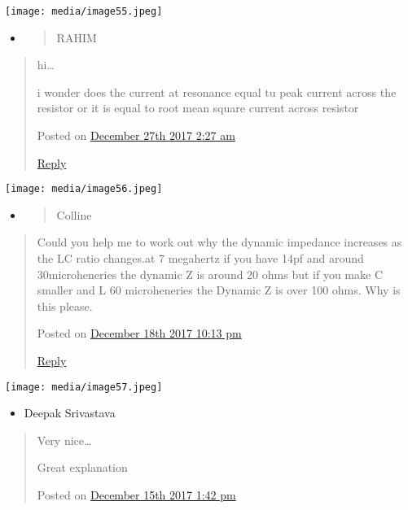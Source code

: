 \documentclass[]{article}
\begin{document}
\texttt{[image: media/image55.jpeg]}

\begin{itemize}
\item
  \begin{quote}
  RAHIM
  \end{quote}
\end{itemize}

\begin{quote}
hi\ldots{}

i wonder does the current at resonance equal tu peak current across the
resistor or it is equal to root mean square current across resistor

Posted on \protect\hyperlink{page10}{December 27th 2017 \textbar{} 2:27
am}

\href{https://www.electronics-tutorials.ws/accircuits/series-resonance.html?replytocom=45585\#respond}{Reply}
\end{quote}

\texttt{[image: media/image56.jpeg]}

\begin{itemize}
\item
  \begin{quote}
  Colline
  \end{quote}
\end{itemize}

\begin{quote}
Could you help me to work out why the dynamic impedance increases as the
LC ratio changes.at 7 megahertz if you have 14pf and around
30microheneries the dynamic Z is around 20 ohms but if you make C
smaller and L 60 microheneries the Dynamic Z is over 100 ohms. Why is
this please.

Posted on \protect\hyperlink{page10}{December 18th 2017 \textbar{} 10:13
pm}

\href{https://www.electronics-tutorials.ws/accircuits/series-resonance.html?replytocom=44972\#respond}{Reply}
\end{quote}

\texttt{[image: media/image57.jpeg]}

\begin{itemize}
\item
  Deepak Srivastava
\end{itemize}

\begin{quote}
Very nice\ldots{}

Great explanation

Posted on \protect\hyperlink{page10}{December 15th 2017 \textbar{} 1:42
pm}
\end{quote}
\end{document}
